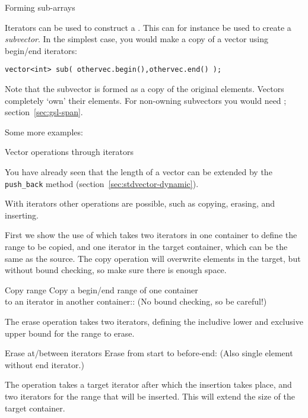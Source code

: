  {Forming sub-arrays}

Iterators can be used to construct a . This can
for instance be used to create a
\emph{subvector}.
In the simplest case, you would make a copy
of a vector using begin/end iterators:
\begin{lstlisting}
vector<int> sub( othervec.begin(),othervec.end() );
\end{lstlisting}

Note that the subvector is formed as a copy of the original elements.
Vectors completely `own' their elements. For non-owning subvectors
you would need ; section~\ref{sec:gsl-span}.

Some more examples:
%

 {Vector operations through iterators}

You have already seen that the length of a vector can be
extended by the \lstinline+push_back+ method
(section~\ref{sec:stdvector-dynamic}).

With iterators other operations are possible,
such as copying, erasing, and inserting.

First we show the use of  which takes
two iterators in one container to define the range to be copied,
and one iterator in the target container, which can be the same as the source.
The copy operation will overwrite elements in the target,
but without bound checking, so make sure there is enough space.

\begin{block}{Copy range}
  \label{sl:iter-copy}
  Copy a begin/end range of one container\\
  to an iterator in another container::
  (No bound checking, so be careful!)
\end{block}

The erase operation  takes two iterators,
defining the includive lower and exclusive upper bound
for the range to erase.

\begin{block}{Erase at/between iterators}
  \label{sl:iter-erase}
  Erase from start to before-end:
  (Also single element without end iterator.)
\end{block}

The  operation takes a target iterator
after which the insertion takes place, and
two iterators for the range that will be inserted.
This will extend the size of the target container.

